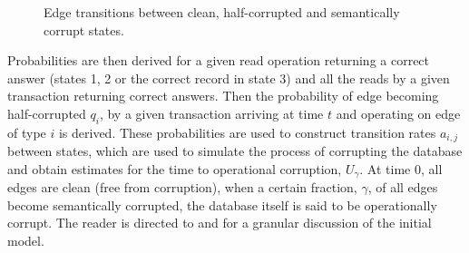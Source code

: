 \documentclass[sigplan,10pt]{acmart}
\begin{document}
\begin{figure}[ht]
  \centering
    \caption{Edge transitions between clean, half-corrupted and semantically corrupt states.}
    \label{state-transitions}
\end{figure}

Probabilities are then derived for a given read operation returning a correct answer (states 1, 2 or the correct record in state 3) and all the reads by a given transaction returning correct answers. Then the probability of edge becoming half-corrupted $q_i$, by a given transaction arriving at time $t$ and operating on edge of type $i$ is derived. These probabilities are used to construct transition rates $a_{i,j}$ between states, which are used to simulate the process of corrupting the database and obtain estimates for the time to operational corruption, $U_{\gamma}$. At time $0$, all edges are clean (free from corruption), when a certain fraction, $\gamma$, of all edges become semantically corrupted, the database itself is said to be operationally corrupt. The reader is directed to \cite{Ezhilchelvan2018} and \cite{Webber2019} for a granular discussion of the initial model.

\end{document}
